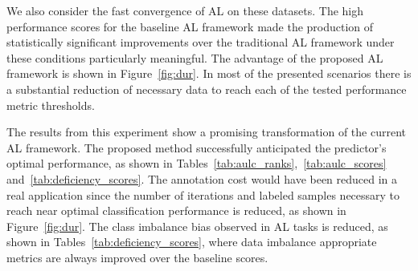 \documentclass[parskip=full]{scrartcl}
\begin{document}
We also consider the fast convergence of AL on these datasets. The high
performance scores for the baseline AL framework made the production of
statistically significant improvements over the traditional AL framework under
these conditions particularly meaningful. The advantage of the proposed AL
framework is shown in Figure~\ref{fig:dur}. In most of the presented scenarios
there is a substantial reduction of necessary data to reach each of the tested
performance metric thresholds. 

The results from this experiment show a promising transformation of the current
AL framework. The proposed method successfully anticipated the predictor's
optimal performance, as shown in
Tables~\ref{tab:aulc_ranks},~\ref{tab:aulc_scores}
and~\ref{tab:deficiency_scores}. The annotation cost would have been reduced
in a real application since the number of iterations and
labeled samples necessary to reach near optimal classification performance is
reduced, as shown in Figure~\ref{fig:dur}. The class imbalance bias observed in
AL tasks is reduced, as shown in Tables~\ref{tab:deficiency_scores}, where data
imbalance appropriate metrics are always improved over the baseline scores.



\end{document}
